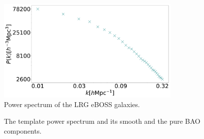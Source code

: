 \documentclass{beamer}
\begin{document}

\begin{frame}
\titlepage %
\end{frame}

\begin{frame}

\begin{figure}[t]
	\centering
	\includegraphics[width=0.8\textwidth]{../figs/Pkrustico.pdf}
	\caption[]{Power spectrum of the LRG eBOSS galaxies.}
	\label{fig:rustico}
\end{figure}
	
\end{frame}
\begin{frame}

\begin{figure}[t]
	\centering
	\caption[]{The template power spectrum and its smooth and the pure BAO components.}
\end{figure}
\end{frame}
\end{document}
